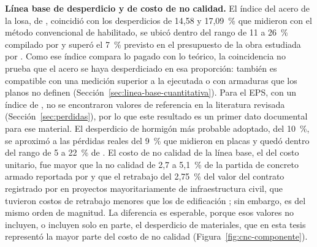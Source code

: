 \textbf{Línea base de desperdicio y de costo de no calidad.} El índice del acero de la losa, de \IDMsinAce{}, coincidió con los desperdicios de 14,58 y 17,09~\% que \textcite[pp.~147, 169]{chino2024} midieron con el método convencional de habilitado, se ubicó dentro del rango de 11 a 26~\% compilado por \textcite[p.~106]{maciel2016} y superó el 7~\% previsto en el presupuesto de la obra estudiada por \textcite[p.~75]{galarza2011}. Como ese índice compara lo pagado con lo teórico, la coincidencia no prueba que el acero se haya desperdiciado en esa proporción: también es compatible con una medición superior a la ejecutada o con armaduras que los planos no definen (Sección~\ref{sec:linea-base-cuantitativa}). Para el EPS, con un índice de \IDMsinEps{}, no se encontraron valores de referencia en la literatura revisada (Sección~\ref{sec:perdidas}), por lo que este resultado es un primer dato documental para ese material. El desperdicio de hormigón más probable adoptado, del 10~\%, se aproximó a las pérdidas reales del 9~\% que \textcite[p.~69]{rojas2018} midieron en placas y quedó dentro del rango de 5 a 22~\% de \textcite[pp.~53, 73]{galarza2011}. El costo de no calidad de la línea base, el \CNCsinDetPct{} del costo unitario, fue mayor que la no calidad de 2,7 a 5,1~\% de la partida de concreto armado reportada por \textcite[p.~1]{gudiel2020} y que el retrabajo del 2,75~\% del valor del contrato registrado por \textcite[p.~8]{forcada2017} en proyectos mayoritariamente de infraestructura civil, que tuvieron costos de retrabajo menores que los de edificación \parencite[pp.~6, 10]{forcada2017}; sin embargo, es del mismo orden de magnitud. La diferencia es esperable, porque esos valores no incluyen, o incluyen solo en parte, el desperdicio de materiales, que en esta tesis representó la mayor parte del costo de no calidad (Figura~\ref{fig:cnc-componente}).

